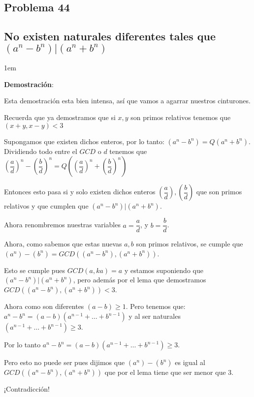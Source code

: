 \documentclass[12pt, fleqn]{article}                             %
\newenvironment{SmallIndentation}[1][0.75em]                    %
    {\begin{adjustwidth}{#1}{}\begin{footnotesize}}                 %
    {\end{footnotesize}\end{adjustwidth}}                           %
\newcommand{\Wrap}[1]{\left( #1 \right)}                        %
\newcommand{\pfrac}[2]{\Wrap{\dfrac{#1}{#2}}}                   %
\begin{document}
    \clearpage
    \subsection{Problema 44}
    \subsection*{No existen naturales diferentes tales que $(a^n-b^n)|(a^n+b^n)$}

        \begin{SmallIndentation}[1em]

            \textbf{Demostración}:


            Esta demostración esta bien intensa, así que vamos a agarrar nuestros
            cinturones.

            Recuerda que ya demostramos que si $x, y$ son primos relativos tenemos
            que $(x+y, x-y) < 3$

            Supongamos que existen dichos enteros, por lo tanto:
            $(a^n-b^n) = Q(a^n+b^n)$.
            Dividiendo todo entre el $GCD$ o $d$ tenemos que
            $\pfrac{a}{d}^n-\pfrac{b}{d}^n = Q\Wrap{\pfrac{a}{d}^n+\pfrac{b}{d}^n}$
            
            Entonces esto pasa si y solo existen dichos enteros
            $\pfrac{a}{d}, \pfrac{b}{d}$ que son primos relativos y que cumplen
            que $(a^n-b^n)|(a^n+b^n)$.

            Ahora renombremos nuestras variables $a = \dfrac{a}{d}$, y $b = \dfrac{b}{d}$.

            Ahora, como sabemos que estas nuevas $a, b$ son primos relativos, se cumple que
            $(a^n) -(b^n) = GCD\Wrap{(a^n -b^n),(a^n + b^n)}$.

            Esto se cumple pues $GCD(a, ka) = a$ y estamos suponiendo que
            $(a^n-b^n)|(a^n+b^n)$, pero además por el lema que demostramos
            $GCD\Wrap{(a^n -b^n),(a^n + b^n)} < 3$.

            Ahora como son diferentes $(a-b)\geq 1$. Pero tenemos que:
            $a^n-b^n = (a-b)(a^{n-1} + \dots + b^{n-1})$
            y al ser naturales $(a^{n-1} + \dots + b^{n-1}) \geq 3$.

            Por lo tanto $a^n-b^n = (a-b)(a^{n-1} + \dots + b^{n-1}) \geq 3$.

            Pero esto no puede ser pues dijimos que
            $(a^n) -(b^n)$ es igual al $GCD\Wrap{(a^n -b^n),(a^n + b^n)}$ que por el
            lema tiene que ser menor que 3.

            ¡Contradicción!

        \end{SmallIndentation}
\end{document}
